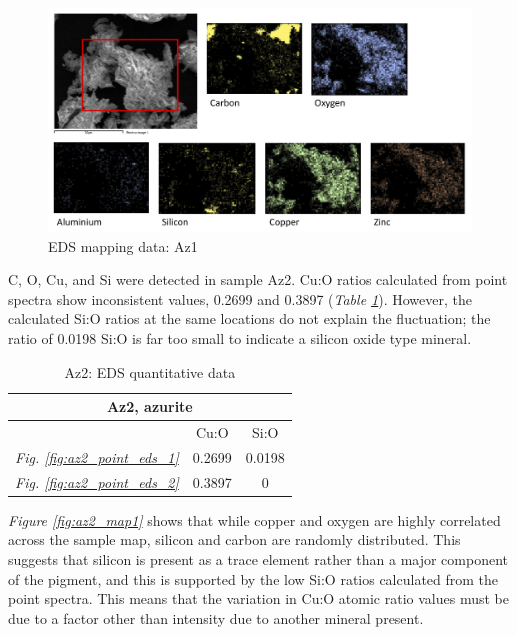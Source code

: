 \begin{figure}[H]
\centering
  \includegraphics[width=0.9\linewidth]{Az1_EDS_map2_250221_img}
\caption[EDS mapping data: Az1]{EDS mapping data: Az1}
\label{fig:az1_map1}
\end{figure}



C, O, Cu, and Si were detected in sample Az2. Cu:O ratios calculated from point spectra show inconsistent values, 0.2699 and 0.3897 (\textit{Table \ref{table:az2_ratios}}). However, the calculated Si:O ratios at the same locations do not explain the fluctuation; the ratio of 0.0198 Si:O is far too small to indicate a silicon oxide type mineral.

\begin{table}[H]
\caption{Az2: EDS quantitative data}
\centering
\label{table:az2_ratios}
\begin{tabular}{c c c}
\toprule
\multicolumn{3}{c}{Az2, azurite} \\
\midrule
~ & Cu:O & Si:O \\
\midrule
\textit{Fig. \ref{fig:az2_point_eds_1}} & 0.2699 & 0.0198 \\
\textit{Fig. \ref{fig:az2_point_eds_2}} & 0.3897 & 0 \\
\bottomrule
\end{tabular}
\end{table}

\textit{Figure \ref{fig:az2_map1}} shows that while copper and oxygen are highly correlated across the sample map, silicon and carbon are randomly distributed. This suggests that silicon is present as a trace element rather than a major component of the pigment, and this is supported by the low Si:O ratios calculated from the point spectra. This means that the variation in Cu:O atomic ratio values must be due to a factor other than intensity due to another mineral present.

